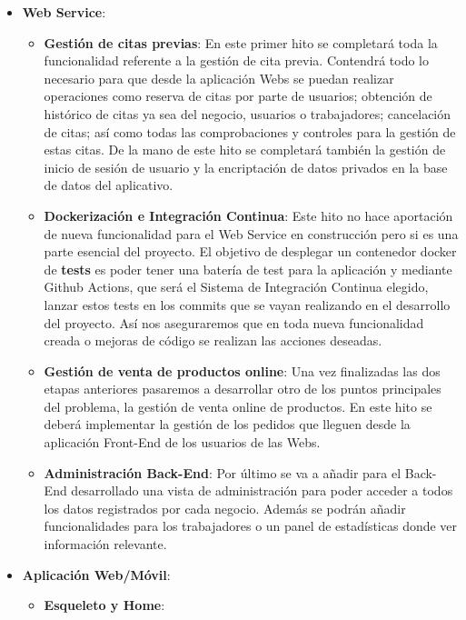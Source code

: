 \vspace{0.5em}
\begin{itemize}
    \item \textbf{Web Service}:
        \begin{itemize}
            \item \textbf{Gestión de citas previas}: En este primer hito se completará toda la funcionalidad referente
            a la gestión de cita previa. Contendrá todo lo necesario para que desde la aplicación Webs se puedan
            realizar operaciones como reserva de citas por parte de usuarios; obtención de histórico de citas ya
            sea del negocio, usuarios o trabajadores; cancelación de citas; así como todas las comprobaciones y
            controles para la gestión de estas citas. De la mano de este hito se completará también la gestión
            de inicio de sesión de usuario y la encriptación de datos privados en la base de datos del aplicativo.

            \item \textbf{Dockerización e Integración Continua}: Este hito no hace aportación de nueva funcionalidad
            para el Web Service en construcción pero si es una parte esencial del proyecto. El objetivo de desplegar un
            contenedor docker de \textbf{tests} es poder tener una batería de test para la aplicación y mediante
            Github Actions, que será el Sistema de Integración Continua elegido, lanzar estos tests en los commits
            que se vayan realizando en el desarrollo del proyecto. Así nos aseguraremos que en toda nueva funcionalidad
            creada o mejoras de código se realizan las acciones deseadas.

            \item \textbf{Gestión de venta de productos online}: Una vez finalizadas las dos etapas anteriores
            pasaremos a desarrollar otro de los puntos principales del problema, la gestión de venta online de
            productos. En este hito se deberá implementar la gestión de los pedidos que lleguen desde la aplicación
            Front-End de los usuarios de las Webs.

            \item \textbf{Administración Back-End}: Por último se va a añadir para el Back-End desarrollado una vista
            de administración para poder acceder a todos los datos registrados por cada negocio. Además se podrán
            añadir funcionalidades para los trabajadores o un panel de estadísticas donde ver información relevante.
        \end{itemize}
    \item \textbf{Aplicación Web/Móvil}:
    \begin{itemize}
                \item \textbf{Esqueleto y Home}:


\end{itemize}
\end{itemize}
